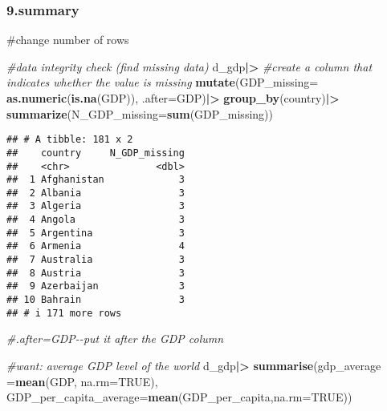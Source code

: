 \documentclass[
]{article}
\newenvironment{Shaded}{\begin{snugshade}}{\end{snugshade}}
\newcommand{\AttributeTok}[1]{\textcolor[rgb]{0.13,0.29,0.53}{#1}}
\newcommand{\CommentTok}[1]{\textcolor[rgb]{0.56,0.35,0.01}{\textit{#1}}}
\newcommand{\ConstantTok}[1]{\textcolor[rgb]{0.56,0.35,0.01}{#1}}
\newcommand{\FunctionTok}[1]{\textcolor[rgb]{0.13,0.29,0.53}{\textbf{#1}}}
\newcommand{\NormalTok}[1]{#1}
\newcommand{\SpecialCharTok}[1]{\textcolor[rgb]{0.81,0.36,0.00}{\textbf{#1}}}
\begin{document}
\hypertarget{summary}{%
\subsubsection{9.summary}\label{summary}}

\#change number of rows

\begin{Shaded}
\begin{Highlighting}[]
\CommentTok{\#data integrity check (find missing data)}
\NormalTok{d\_gdp}\SpecialCharTok{|\textgreater{}}
  \CommentTok{\#create a column that indicates whether the value is missing}
  \FunctionTok{mutate}\NormalTok{(}\AttributeTok{GDP\_missing=} \FunctionTok{as.numeric}\NormalTok{(}\FunctionTok{is.na}\NormalTok{(GDP)), }\AttributeTok{.after=}\NormalTok{GDP)}\SpecialCharTok{|\textgreater{}}
           \FunctionTok{group\_by}\NormalTok{(country)}\SpecialCharTok{|\textgreater{}}
           \FunctionTok{summarize}\NormalTok{(}\AttributeTok{N\_GDP\_missing=}\FunctionTok{sum}\NormalTok{(GDP\_missing))}
\end{Highlighting}
\end{Shaded}

\begin{verbatim}
## # A tibble: 181 x 2
##    country     N_GDP_missing
##    <chr>               <dbl>
##  1 Afghanistan             3
##  2 Albania                 3
##  3 Algeria                 3
##  4 Angola                  3
##  5 Argentina               3
##  6 Armenia                 4
##  7 Australia               3
##  8 Austria                 3
##  9 Azerbaijan              3
## 10 Bahrain                 3
## # i 171 more rows
\end{verbatim}

\begin{Shaded}
\begin{Highlighting}[]
\CommentTok{\#.after=GDP{-}{-}put it after the GDP column}
\end{Highlighting}
\end{Shaded}

\begin{Shaded}
\begin{Highlighting}[]
\CommentTok{\#want: average GDP level of the world}
\NormalTok{d\_gdp}\SpecialCharTok{|\textgreater{}}
  \FunctionTok{summarise}\NormalTok{(}\AttributeTok{gdp\_average =}\FunctionTok{mean}\NormalTok{(GDP, }\AttributeTok{na.rm=}\ConstantTok{TRUE}\NormalTok{),}
            \AttributeTok{GDP\_per\_capita\_average=}\FunctionTok{mean}\NormalTok{(GDP\_per\_capita,}\AttributeTok{na.rm=}\ConstantTok{TRUE}\NormalTok{))}
\end{Highlighting}
\end{Shaded}
\end{document}
